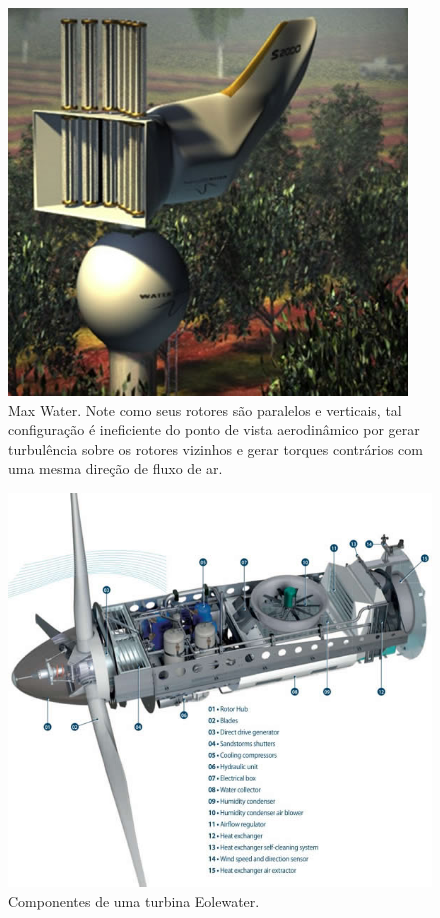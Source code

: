 \begin{figure}[!ht]
\centering
\includegraphics[scale=0.6]{editaveis/figuras/max_water}
\caption[Max Water]{Max Water. Note como seus rotores são paralelos e verticais, tal configuração é ineficiente do ponto
	de vista aerodinâmico por gerar turbulência sobre os rotores vizinhos e gerar torques contrários com uma mesma 
	direção de fluxo de ar.\footnotemark}

\label{max_water_turbina}
\end{figure}

\begin{figure}[!htbp]
\centering
\includegraphics[scale=0.6]{editaveis/figuras/Componentes}
\caption[Componentes de uma turbina Eolewater.]{Componentes de uma turbina Eolewater.\footnotemark}
\FloatBarrier
\label{Eole_Water}
\end{figure}

